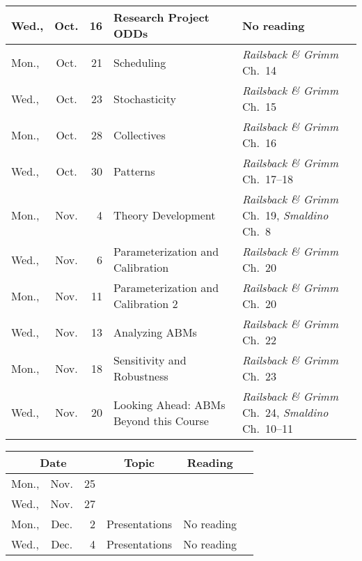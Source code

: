 \documentclass[11pt,twoside]{jgsyllabus}\usepackage[]{graphicx}\usepackage[]{xcolor}
\begin{document}
\begin{center}
\begin{tabular}{l@{~}c@{~}r>{\raggedright}m{2.6in}>{\centering}m{2in}c}
   \midrule
Wed., & Oct. &  16 & Research Project ODDs & No reading &  \\ 
   \midrule
Mon., & Oct. &  21 & Scheduling & \emph{Railsback \& Grimm\/} Ch.~14 &  \\ 
   \midrule
Wed., & Oct. &  23 & Stochasticity & \emph{Railsback \& Grimm\/} Ch.~15 &  \\ 
   \midrule
Mon., & Oct. &  28 & Collectives & \emph{Railsback \& Grimm\/} Ch.~16 &  \\ 
   \midrule
Wed., & Oct. &  30 & Patterns & \emph{Railsback \& Grimm\/} Ch.~17--18 &  \\ 
   \midrule
Mon., & Nov. &   4 & Theory Development & \emph{Railsback \& Grimm\/} Ch.~19, \emph{Smaldino\/} Ch.~8 &  \\ 
   \midrule
Wed., & Nov. &   6 & Parameterization and Calibration & \emph{Railsback \& Grimm\/} Ch.~20 &  \\ 
   \midrule
Mon., & Nov. &  11 & Parameterization and Calibration 2 & \emph{Railsback \& Grimm\/} Ch.~20 &  \\ 
   \midrule
Wed., & Nov. &  13 & Analyzing ABMs & \emph{Railsback \& Grimm\/} Ch.~22 &  \\ 
   \midrule
Mon., & Nov. &  18 & Sensitivity and Robustness & \emph{Railsback \& Grimm\/} Ch.~23 &  \\ 
   \midrule
Wed., & Nov. &  20 & Looking Ahead: ABMs Beyond this Course & \emph{Railsback \& Grimm\/} Ch.~24, \emph{Smaldino\/} Ch.~10--11 &  \\ 
   \bottomrule
\end{tabular}

\end{center}

\begin{center}
\begin{tabular}{l@{~}c@{~}r>{\raggedright}m{2.6in}>{\centering}m{2in}c}
  \toprule
  \multicolumn{3}{c}{\bfseries Date} & \multicolumn{1}{c}{\bfseries Topic} &\multicolumn{1}{c}{\bfseries Reading} &\\
 \midrule
Mon., & Nov. &  25 & \multicolumn{2}{l}{\multirow{3}{*}{\bfseries\scshape\Large Thanksgiving Break}} & \\%
  Wed., & Nov. &  27 &  &  &  \\ 
   \midrule
Mon., & Dec. &   2 & Presentations & No reading &  \\ 
   \midrule
Wed., & Dec. &   4 & Presentations & No reading &  \\ 
   \bottomrule
\end{tabular}

\end{center}
%
\end{document}
